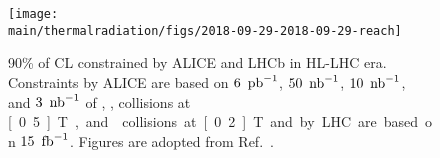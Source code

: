 \documentclass[../report.tex]{subfiles}
\providecommand{\main}{..}
\begin{document}
\begin{figure}[htbp]
\begin{center}
\texttt{[image: \\main/thermalradiation/figs/2018-09-29-2018-09-29-reach]}
\end{center}
\caption{90\% of CL constrained by ALICE and LHCb in HL-LHC era.
Constraints by ALICE are based on 
$\unit[6]{\Upb^{-1}}$, $\unit[50]{\Unb^{-1}}$, $\unit[10]{\Unb^{-1}}$, and $\unit[3]{\Unb^{-1}}$
of \pp, \pPb, \PbPb{} collisions at \unit[0.5]{T}, and \PbPb{} collisions at \unit[0.2]{T}
and by LHC are based on $\unit[15]{\Ufb^{-1}}$.
Figures are adopted from Ref.~\cite{Ilten:2018crw}.}
\label{fig:darkphoton_alice_lhcb_hllhc}
\end{figure}




\end{document}
